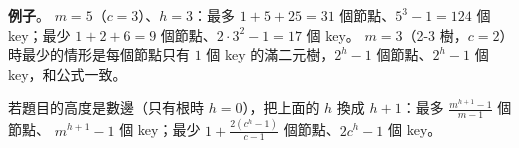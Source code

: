 \begin{pastsoln}
\textbf{例子}。 $m = 5$（$c = 3$）、$h = 3$：最多 $1 + 5 + 25 = 31$ 個節點、$5^3 - 1 = 124$ 個 key；最少
$1 + 2 + 6 = 9$ 個節點、$2 \cdot 3^2 - 1 = 17$ 個 key。 $m = 3$（2-3 樹，$c = 2$）時最少的情形是每個節點只有
$1$ 個 key 的滿二元樹，$2^h - 1$ 個節點、$2^h - 1$ 個 key，和公式一致。

若題目的高度是數邊（只有根時 $h = 0$），把上面的 $h$ 換成 $h + 1$：最多 $\frac{m^{h+1} - 1}{m - 1}$ 個節點、
$m^{h+1} - 1$ 個 key；最少 $1 + \frac{2(c^{h} - 1)}{c - 1}$ 個節點、$2c^{h} - 1$ 個 key。
\end{pastsoln}

